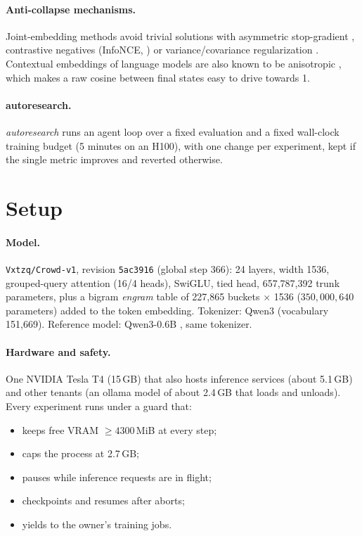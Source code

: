\documentclass[11pt]{article}
\begin{document}
\paragraph{Anti-collapse mechanisms.} Joint-embedding methods avoid trivial solutions with asymmetric stop-gradient
\cite{grill2020byol}, contrastive negatives (InfoNCE, \cite{oord2018cpc}) or variance/covariance regularization
\cite{bardes2022vicreg}. Contextual embeddings of language models are also known to be anisotropic
\cite{ethayarajh2019contextual}, which makes a raw cosine between final states easy to drive towards 1.

\paragraph{autoresearch.} \emph{autoresearch} \cite{karpathy2026autoresearch} runs an agent loop over a fixed
evaluation and a fixed wall-clock training budget (5 minutes on an H100), with one change per experiment, kept if the
single metric improves and reverted otherwise.

\section{Setup}
\label{sec:setup}
\paragraph{Model.} \texttt{Vxtzq/Crowd-v1}, revision \texttt{5ac3916} (global step 366): 24 layers, width 1536,
grouped-query attention (16/4 heads), SwiGLU, tied head, 657{,}787{,}392 trunk parameters, plus a bigram \emph{engram}
table of 227{,}865 buckets $\times$ 1536 ($350{,}000{,}640$ parameters) added to the token embedding. Tokenizer: Qwen3
(vocabulary 151{,}669). Reference model: Qwen3-0.6B \cite{qwen3report}, same tokenizer.

\paragraph{Hardware and safety.} One NVIDIA Tesla T4 (15\,GB) that also hosts inference services (about 5.1\,GB) and
other tenants (an ollama model of about 2.4\,GB that loads and unloads). Every experiment runs under a guard that:
\begin{itemize}
\item keeps free VRAM $\ge4300$\,MiB at every step;
\item caps the process at 2.7\,GB;
\item pauses while inference requests are in flight;
\item checkpoints and resumes after aborts;
\item yields to the owner's training jobs.
\end{itemize}
\end{document}
